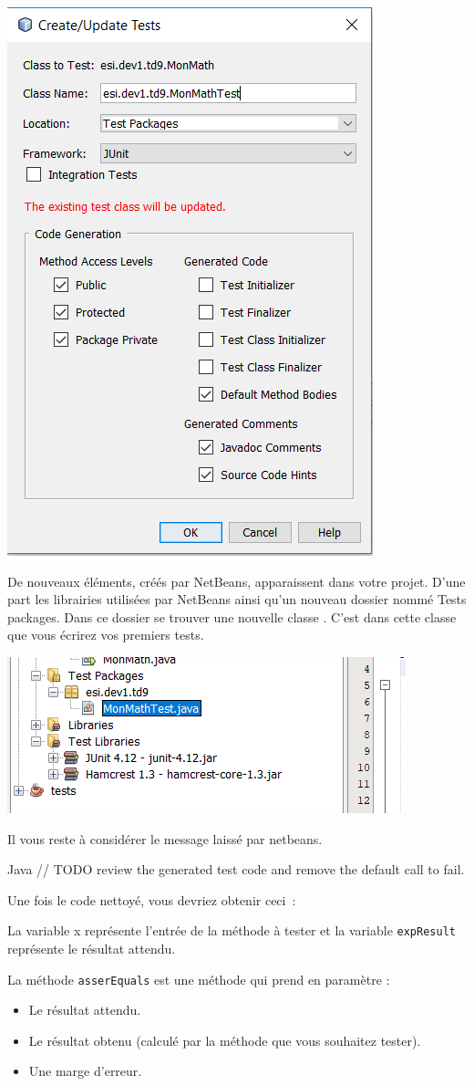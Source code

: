 \documentclass[a4paper,11pt]{article}
\begin{document}
	\begin{center}
		\includegraphics[width=.5\textwidth]{images/config_tests.png}
	\end{center}

	De nouveaux éléments, créés par NetBeans, apparaissent dans votre projet. D’une part les librairies utilisées par NetBeans ainsi qu’un nouveau dossier nommé Tests packages. Dans ce dossier se trouver une nouvelle classe . C'est dans cette classe que vous écrirez vos premiers tests.

	\begin{center}
		\includegraphics[width=.5\textwidth]{images/libraries.png}
	\end{center}

	Il vous reste à considérer le message laissé par netbeans.
	\begin{Code}{Java}
		// TODO review the generated test code and remove the default call to fail.
	\end{Code}

	Une fois le code nettoyé, vous devriez obtenir ceci~:

	La variable x représente l’entrée de la méthode à tester et la variable \texttt{expResult} représente le résultat attendu.

	La méthode \texttt{asserEquals} est une méthode qui prend en paramètre :
	\begin{itemize}
		\item Le résultat attendu.
		\item Le résultat obtenu (calculé par la méthode que vous souhaitez tester).
		\item Une marge d’erreur.
	\end{itemize}
\end{document}
